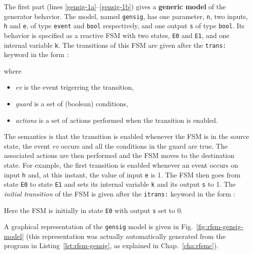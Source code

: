\medskip The first part (lines \ref{gensig-1a}--\ref{gensig-1b}) gives a \textbf{generic model} of
the generator behavior. The model, named \verb|gensig|, has one parameter, \verb|n|, two inputs,
\verb|h| and \verb|e|, of type \verb|event| and \verb|bool| respectively, and one output \verb|s| of
type \verb|bool|. Its behavior is specified as a reactive FSM with two states, \verb|E0| and
\verb|E1|, and one internal variable \verb|k|. The transitions of this FSM are given after the
\verb|trans:| keyword in the form :
\begin{center}
\end{center}
where
\begin{itemize}
\item \emph{ev} is the event trigerring the transition,
\item \emph{guard} is a set of (boolean) conditions,
\item \emph{actions} is a set of actions performed when the transition is enabled.
\end{itemize}
The semantics is that the transition is enabled
whenever the FSM is in the source state, the event \emph{ev} occurs and all the conditions in the
guard are true. The associated actions
are then performed and the FSM moves to the destination state. For example, the first transition is
enabled whenever an event occurs on input \verb|h| and, at this instant, the value of input \verb|e|
is 1. The FSM then goes from state \verb|E0| to state \verb|E1| and sets its internal variable 
\verb|k| and its output \verb|s| to 1. The \emph{initial transition} of the FSM is given 
after the \verb|itrans:| keyword in the form :
\begin{center}
\end{center}
Here the FSM is initially in state \verb|E0| with output \verb|s| set to 0.

A graphical representation of the \verb|gensig| model is given in
Fig.~\ref{fig:rfsm-gensig-model} (this representation was actually automatically generated from the
program in Listing~\ref{lst:rfsm-gensig}, as explained in Chap.~\ref{cha:rfsmc}). 

